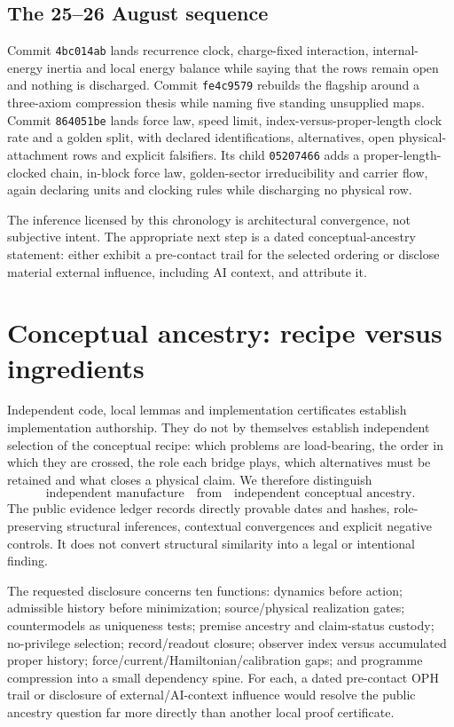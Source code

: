 \documentclass[10pt,a4paper]{article}
\theoremstyle{definition}
\theoremstyle{remark}
\begin{document}
\subsection{The 25--26 August sequence}

Commit \texttt{4bc014ab} lands recurrence clock, charge-fixed interaction,
internal-energy inertia and local energy balance while saying that the rows
remain open and nothing is discharged.  Commit \texttt{fe4c9579} rebuilds the
flagship around a three-axiom compression thesis while naming five standing
unsupplied maps.  Commit \texttt{864051be} lands force law, speed limit,
index-versus-proper-length clock rate and a golden split, with declared
identifications, alternatives, open physical-attachment rows and explicit
falsifiers.  Its child \texttt{05207466} adds a proper-length-clocked chain,
in-block force law, golden-sector irreducibility and carrier flow, again
declaring units and clocking rules while discharging no physical row.

The inference licensed by this chronology is architectural convergence, not
subjective intent.  The appropriate next step is a dated conceptual-ancestry
statement: either exhibit a pre-contact trail for the selected ordering or
disclose material external influence, including AI context, and attribute it.

\section{Conceptual ancestry: recipe versus ingredients}
\label{sec:ancestry}

Independent code, local lemmas and implementation certificates establish
implementation authorship.  They do not by themselves establish independent
selection of the conceptual recipe: which problems are load-bearing, the
order in which they are crossed, the role each bridge plays, which
alternatives must be retained and what closes a physical claim.  We therefore
distinguish
\[
\text{independent manufacture}
\quad\text{from}\quad
\text{independent conceptual ancestry}.
\]
The public evidence ledger records directly provable dates and hashes,
role-preserving structural inferences, contextual convergences and explicit
negative controls.  It does not convert structural similarity into a legal or
intentional finding.

The requested disclosure concerns ten functions: dynamics before action;
admissible history before minimization; source/physical realization gates;
countermodels as uniqueness tests; premise ancestry and claim-status custody;
no-privilege selection; record/readout closure; observer index versus
accumulated proper history; force/current/Hamiltonian/calibration gaps; and
programme compression into a small dependency spine.  For each, a dated
pre-contact OPH trail or disclosure of external/AI-context influence would
resolve the public ancestry question far more directly than another local
proof certificate.
\end{document}
